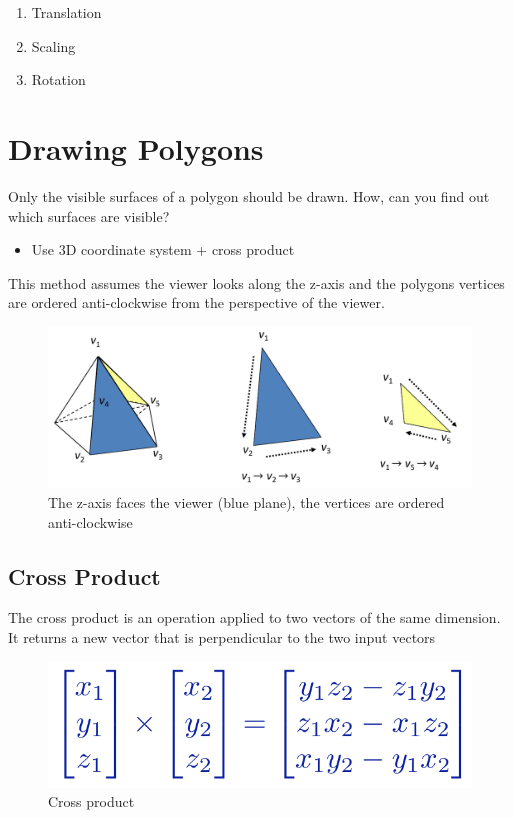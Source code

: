 \documentclass[
]{book}
\providecommand{\tightlist}{%
  \setlength{\itemsep}{0pt}\setlength{\parskip}{0pt}}
\begin{document}
\begin{enumerate}
\def\labelenumi{\arabic{enumi}.}
\tightlist
\item
  Translation
\item
  Scaling
\item
  Rotation
\end{enumerate}

\hypertarget{drawing-polygons}{%
\section{Drawing Polygons}\label{drawing-polygons}}

Only the visible {surfaces} of a polygon should be drawn. How, can you find out which surfaces are visible?

\begin{itemize}
\tightlist
\item
  Use 3D coordinate system + cross product
\end{itemize}

This method assumes the {viewer looks along the z-axis} and the polygons vertices are {ordered anti-clockwise from the perspective of the viewer}.

\begin{figure}
\centering
\includegraphics{img/08-image23.png}
\caption{\label{fig:draw-polygon}The z-axis faces the viewer (blue plane), the vertices are ordered anti-clockwise}
\end{figure}

\hypertarget{cross-product}{%
\subsection{Cross Product}\label{cross-product}}

The cross product is an operation applied to two vectors of the same dimension. It returns a new vector that is {perpendicular} to the two input vectors

\begin{figure}
\centering
\includegraphics{img/08-image24.png}
\caption{\label{fig:cross-prod}Cross product}
\end{figure}
\end{document}
